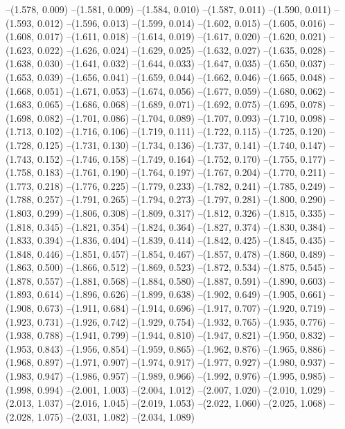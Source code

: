 {--(1.578, 0.009)
--(1.581, 0.009)
--(1.584, 0.010)
--(1.587, 0.011)
--(1.590, 0.011)
--(1.593, 0.012)
--(1.596, 0.013)
--(1.599, 0.014)
--(1.602, 0.015)
--(1.605, 0.016)
--(1.608, 0.017)
--(1.611, 0.018)
--(1.614, 0.019)
--(1.617, 0.020)
--(1.620, 0.021)
--(1.623, 0.022)
--(1.626, 0.024)
--(1.629, 0.025)
--(1.632, 0.027)
--(1.635, 0.028)
--(1.638, 0.030)
--(1.641, 0.032)
--(1.644, 0.033)
--(1.647, 0.035)
--(1.650, 0.037)
--(1.653, 0.039)
--(1.656, 0.041)
--(1.659, 0.044)
--(1.662, 0.046)
--(1.665, 0.048)
--(1.668, 0.051)
--(1.671, 0.053)
--(1.674, 0.056)
--(1.677, 0.059)
--(1.680, 0.062)
--(1.683, 0.065)
--(1.686, 0.068)
--(1.689, 0.071)
--(1.692, 0.075)
--(1.695, 0.078)
--(1.698, 0.082)
--(1.701, 0.086)
--(1.704, 0.089)
--(1.707, 0.093)
--(1.710, 0.098)
--(1.713, 0.102)
--(1.716, 0.106)
--(1.719, 0.111)
--(1.722, 0.115)
--(1.725, 0.120)
--(1.728, 0.125)
--(1.731, 0.130)
--(1.734, 0.136)
--(1.737, 0.141)
--(1.740, 0.147)
--(1.743, 0.152)
--(1.746, 0.158)
--(1.749, 0.164)
--(1.752, 0.170)
--(1.755, 0.177)
--(1.758, 0.183)
--(1.761, 0.190)
--(1.764, 0.197)
--(1.767, 0.204)
--(1.770, 0.211)
--(1.773, 0.218)
--(1.776, 0.225)
--(1.779, 0.233)
--(1.782, 0.241)
--(1.785, 0.249)
--(1.788, 0.257)
--(1.791, 0.265)
--(1.794, 0.273)
--(1.797, 0.281)
--(1.800, 0.290)
--(1.803, 0.299)
--(1.806, 0.308)
--(1.809, 0.317)
--(1.812, 0.326)
--(1.815, 0.335)
--(1.818, 0.345)
--(1.821, 0.354)
--(1.824, 0.364)
--(1.827, 0.374)
--(1.830, 0.384)
--(1.833, 0.394)
--(1.836, 0.404)
--(1.839, 0.414)
--(1.842, 0.425)
--(1.845, 0.435)
--(1.848, 0.446)
--(1.851, 0.457)
--(1.854, 0.467)
--(1.857, 0.478)
--(1.860, 0.489)
--(1.863, 0.500)
--(1.866, 0.512)
--(1.869, 0.523)
--(1.872, 0.534)
--(1.875, 0.545)
--(1.878, 0.557)
--(1.881, 0.568)
--(1.884, 0.580)
--(1.887, 0.591)
--(1.890, 0.603)
--(1.893, 0.614)
--(1.896, 0.626)
--(1.899, 0.638)
--(1.902, 0.649)
--(1.905, 0.661)
--(1.908, 0.673)
--(1.911, 0.684)
--(1.914, 0.696)
--(1.917, 0.707)
--(1.920, 0.719)
--(1.923, 0.731)
--(1.926, 0.742)
--(1.929, 0.754)
--(1.932, 0.765)
--(1.935, 0.776)
--(1.938, 0.788)
--(1.941, 0.799)
--(1.944, 0.810)
--(1.947, 0.821)
--(1.950, 0.832)
--(1.953, 0.843)
--(1.956, 0.854)
--(1.959, 0.865)
--(1.962, 0.876)
--(1.965, 0.886)
--(1.968, 0.897)
--(1.971, 0.907)
--(1.974, 0.917)
--(1.977, 0.927)
--(1.980, 0.937)
--(1.983, 0.947)
--(1.986, 0.957)
--(1.989, 0.966)
--(1.992, 0.976)
--(1.995, 0.985)
--(1.998, 0.994)
--(2.001, 1.003)
--(2.004, 1.012)
--(2.007, 1.020)
--(2.010, 1.029)
--(2.013, 1.037)
--(2.016, 1.045)
--(2.019, 1.053)
--(2.022, 1.060)
--(2.025, 1.068)
--(2.028, 1.075)
--(2.031, 1.082)
--(2.034, 1.089)
}
